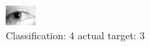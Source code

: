 \begin{figure}[h!]
\begin{center}
\includegraphics[width=0.60\columnwidth]{figures/ID1262_class_4_target_3.png}
\end{center}
\caption{ Classification: 4 actual target: 3}
\label{fig:ID1262_class_4_target_3}
\end{figure}
